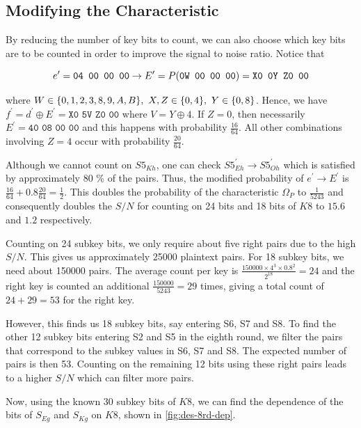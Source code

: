 \documentclass[twoside]{article}
\begin{document}
\subsection{Modifying the Characteristic}
By reducing the number of key bits to count, we can also choose which key bits
are to be counted in order to improve the signal to noise ratio. Notice that

\begin{equation}
    e^\prime = \texttt{04 00 00 00} \rightarrow E^\prime = P(\texttt{0W 00 00 00}) = \texttt{X0 0Y Z0 00}
    \label{eq:des-8-r5-rel}
\end{equation}

where \(W \in \{0,1,2,3,8,9,A,B\},\ X,Z \in \{0,4\},\ Y \in
\{0,8\}\). Hence, we have \(f^\prime = d^\prime \oplus E^\prime = \texttt{X0
5V Z0 00}\) where \(V = Y \oplus 4\). If \(Z = 0\), then necessarily \(E^\prime
= \texttt{40 08 00 00}\) and this happens with probability \(\frac{16}{64}\).
All other combinations involving \(Z = 4\) occur with probability
\(\frac{20}{64}\).

Although we cannot count on \(S5_{Kh}\), one can check \(S5^\prime_{Eh}
\rightarrow S5^\prime_{Oh}\) which is satisfied by approximately 80 \% of the
pairs. Thus, the modified probability of \(e^\prime \rightarrow E^\prime\) is
\(\frac{16}{64} + 0.8\frac{20}{64} = \frac{1}{2}\). This doubles the probability
of the characteristic \(\Omega_P\) to \(\frac{1}{5243}\) and consequently
doubles the \(S/N\) for counting on 24 bits and 18 bits of \(K8\) to \(15.6\)
and \(1.2\) respectively.

Counting on 24 subkey bits, we only require about five right pairs due to the
high \(S/N\). This gives us approximately 25000 plaintext pairs. For 18 subkey
bits, we need about 150000 pairs. The average count per key is \(\frac{150000
\times 4^3 \times 0.8^2}{2^18} = 24\) and the right key is counted an additional
\(\frac{150000}{5243} = 29\) times, giving a total count of \(24 + 29 = 53\) for
the right key.

However, this finds us 18 subkey bits, say entering S6, S7 and S8. To find the
other 12 subkey bits entering S2 and S5 in the eighth round, we filter the pairs
that correspond to the subkey values in S6, S7 and S8. The expected number of
pairs is then 53. Counting on the remaining 12 bits using these right pairs
leads to a higher \(S/N\) which can filter more pairs.

Now, using the known 30 subkey bits of \(K8\), we can find the dependence of the
bits of \(S_{Eg}\) and \(S_{Kg}\) on \(K8\), shown in \autoref{fig:des-8rd-dep}.
\end{document}
